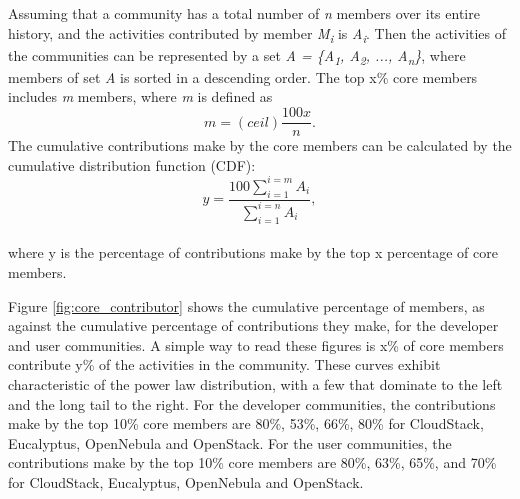 \documentclass[conference]{IEEEtran}
\begin{document}
Assuming that a community has a total number of \textit{n} members over its entire history, and the activities contributed by member \textit{M\textsubscript{i}} is \textit{A\textsubscript{i}}. Then the activities of the communities can be represented by a set \textit{A = \{A\textsubscript{1}, A\textsubscript{2}, ..., A\textsubscript{n}\}}, where members of set \textit{A} is sorted in a descending order. The top x\% core members includes \textit{m} members, where \textit{m} is defined as
\begin{equation}
\label{eq:top_m_members}
m = (ceil) \frac{ 100x }{n}.
\end{equation}
The cumulative contributions make by the core members can be calculated by the cumulative distribution function (CDF):
\begin{equation}
\label{eq:top_m_contributions}
y = \frac{100 \sum_{i=1}^{i=m} A_{i}}{\sum_{i=1}^{i=n} A_{i}},
\end{equation}
\\where y is the percentage of contributions make by the top x percentage of core members. 

Figure \ref{fig:core_contributor} shows the cumulative percentage of members, as against the cumulative percentage of contributions they make, for the developer and user communities. A simple way to read these figures is x\% of core members contribute y\% of the activities in the community. These curves exhibit characteristic of the power law distribution, with a few that dominate to the left and the long tail to the right. For the developer communities, the contributions make by the top 10\% core members are 80\%, 53\%, 66\%, 80\% for CloudStack, Eucalyptus, OpenNebula and OpenStack.  For the user communities, the contributions make by the top 10\% core members are 80\%, 63\%, 65\%, and 70\% for CloudStack, Eucalyptus, OpenNebula and OpenStack. 
\end{document}
